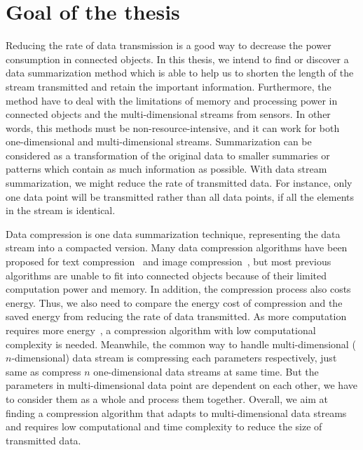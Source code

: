 \section{Goal of the thesis}

Reducing the rate of data transmission is a good way to decrease the power
consumption in connected objects. In this thesis, we intend to find or discover
a data summarization method which is able to help us to shorten the length of
the stream transmitted and retain the important information. Furthermore, the
method have to deal with the limitations of memory and processing power in
connected objects and the multi-dimensional streams from sensors. In other
words, this methods must be non-resource-intensive, and it can work for both
one-dimensional and multi-dimensional streams.
Summarization can be considered as a transformation of the original data to
smaller summaries or patterns which contain as much information as possible.
With data stream summarization, we might reduce the rate of transmitted data.
For instance, only one data point will be transmitted rather than all data
points, if all the elements in the stream is identical. 

Data compression is one data summarization technique, representing the data
stream into a compacted version. Many data compression algorithms have been
proposed for text compression~\cite{shanmugasundaram2011comparative,
sayood2017introduction} and image compression~\cite{shum2003survey,
zaineldin2015image}, but most previous algorithms are unable to fit into
connected objects because of their limited computation power and memory. In
addition, the compression process also costs energy. Thus, we also need to
compare the energy cost of compression and the saved energy from reducing the
rate of data transmitted. As more computation requires more
energy~\cite{pope2018accelerometer}, a compression algorithm with low
computational complexity is needed.  Meanwhile, the common way to handle
multi-dimensional ($n$-dimensional) data stream is compressing each parameters
respectively, just same as compress $n$ one-dimensional data streams at same
time. But the parameters in multi-dimensional data point are dependent on each
other, we have to consider them as a whole and process them together. Overall,
we aim at finding a compression algorithm that adapts to multi-dimensional data
streams and requires low computational and time complexity to reduce the size of
transmitted data.


